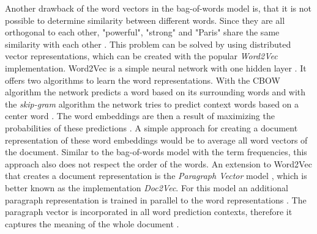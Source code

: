 Another drawback of the word vectors in the bag-of-words model is, that it is not possible to determine similarity between different words.
Since they are all orthogonal to each other, "powerful", "strong" and "Paris" share the same similarity with each other \cite[p. 1]{Mikolov2014}.
This problem can be solved by using distributed vector representations, which can be created with the popular \textit{Word2Vec} implementation.
Word2Vec is a simple neural network with one hidden layer \cite[p. 22]{Grzegorczyk2018}.
It offers two algorithms to learn the word representations.
With the \ac{CBOW} algorithm the network predicts a word based on its surrounding words and with the \textit{skip-gram} algorithm the network tries to predict context words based on a center word \cite[pp. 4-5]{Mikolov2013}.
The word embeddings are then a result of maximizing the probabilities of these predictions \cite[p. 23]{Grzegorczyk2018}.
A simple approach for creating a document representation of these word embeddings would be to average all word vectors of the document.
Similar to the bag-of-words model with the term frequencies, this approach also does not respect the order of the words.
An extension to Word2Vec that creates a document representation is the \textit{Paragraph Vector} model \cite[p. 1]{Mikolov2014}, which is better known as the implementation \textit{Doc2Vec}.
For this model an additional paragraph representation is trained in parallel to the word representations \cite[p. 3]{Mikolov2014}.
The paragraph vector is incorporated in all word prediction contexts, therefore it captures the meaning of the whole document \cite[p. 3]{Mikolov2014}.

